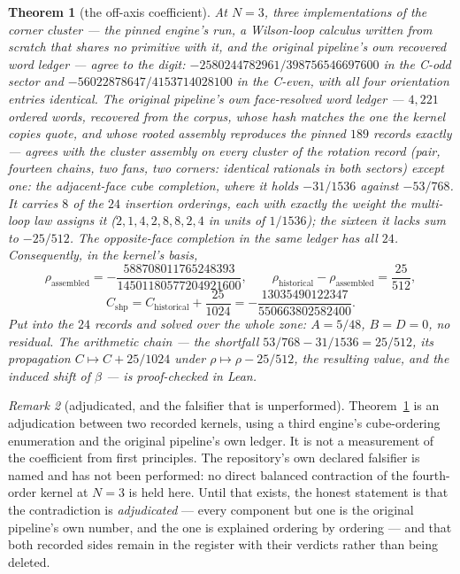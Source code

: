 \documentclass[11pt]{article}
\newtheorem{theorem}{Theorem}[section]
\theoremstyle{definition}
\theoremstyle{remark}
\newtheorem{remark}[theorem]{Remark}
\newcommand{\chk}[1]{}
\begin{document}
\begin{theorem}[the off-axis coefficient]\label{thm:c2}
At $N=3$, three implementations of the corner cluster --- the pinned engine's
run, a Wilson-loop calculus written from scratch that shares no primitive with
it, and the original pipeline's own recovered word ledger --- agree to the
digit:
$-2580244782961/398756546697600$ in the C-odd sector and
$-56022878647/4153714028100$ in the C-even, with all four orientation entries
identical. The original pipeline's own face-resolved word ledger --- $4{,}221$
ordered words, recovered from the corpus, whose hash matches the one the kernel
copies quote, and whose rooted assembly reproduces the pinned $189$ records
exactly --- agrees with the cluster assembly on \emph{every} cluster of the
rotation record (pair, fourteen chains, two fans, two corners: identical
rationals in both sectors) except one: the adjacent-face cube completion, where
it holds $-31/1536$ against $-53/768$. It carries $8$ of the $24$ insertion
orderings, each with exactly the weight the multi-loop law assigns it
($2,1,4,2,8,8,2,4$ in units of $1/1536$); the sixteen it lacks sum to
$-25/512$. The opposite-face completion in the same ledger has all $24$.
Consequently, in the kernel's basis,
\[
  \rho_{\mathrm{assembled}}=-\frac{588708011765248393}{14501180577204921600},
  \qquad
  \rho_{\mathrm{historical}}-\rho_{\mathrm{assembled}}=\frac{25}{512},
\]
\[
  C_{\mathrm{shp}}=C_{\mathrm{historical}}+\frac{25}{1024}
  =-\frac{13035490122347}{550663802582400}.
\]
Put into the $24$ records and solved over the whole zone: $A=5/48$, $B=D=0$, no
residual. The arithmetic chain --- the shortfall $53/768-31/1536=25/512$, its
propagation $C\mapsto C+25/1024$ under $\rho\mapsto\rho-25/512$, the resulting
value, and the induced shift of $\beta$ --- is proof-checked in
Lean.\chk{FINDING: C\_shp from the assembled amplitudes in the kernel's basis is C\_historical + 25/1024, the registered continuation-shifted value}
\end{theorem}

\begin{remark}[adjudicated, and the falsifier that is unperformed]\label{rem:adjudicated}
Theorem~\ref{thm:c2} is an adjudication between two recorded kernels, using a
third engine's cube-ordering enumeration and the original pipeline's own
ledger. It is not a measurement of the coefficient from first principles. The
repository's own declared falsifier is named and has not been performed: no
direct balanced contraction of the fourth-order kernel at $N=3$ is held here.
Until that exists, the honest statement is that the contradiction is
\emph{adjudicated} --- every component but one is the original pipeline's own
number, and the one is explained ordering by ordering --- and that both
recorded sides remain in the register with their verdicts rather than being
deleted.
\end{remark}
\end{document}
